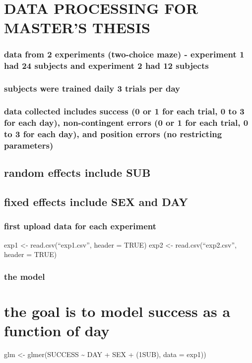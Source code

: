 \documentclass[]{article}
\title{}
\author{}
\date{}
\begin{document}
\section{DATA PROCESSING FOR MASTER'S
THESIS}\label{data-processing-for-masters-thesis}

\subsubsection{data from 2 experiments (two-choice maze) - experiment 1
had 24 subjects and experiment 2 had 12
subjects}\label{data-from-2-experiments-two-choice-maze---experiment-1-had-24-subjects-and-experiment-2-had-12-subjects}

\subsubsection{subjects were trained daily 3 trials per
day}\label{subjects-were-trained-daily-3-trials-per-day}

\subsubsection{data collected includes success (0 or 1 for each trial, 0
to 3 for each day), non-contingent errors (0 or 1 for each trial, 0 to 3
for each day), and position errors (no restricting
parameters)}\label{data-collected-includes-success-0-or-1-for-each-trial-0-to-3-for-each-day-non-contingent-errors-0-or-1-for-each-trial-0-to-3-for-each-day-and-position-errors-no-restricting-parameters}

\subsection{random effects include
SUB}\label{random-effects-include-sub}

\subsection{fixed effects include SEX and
DAY}\label{fixed-effects-include-sex-and-day}

\subsubsection{first upload data for each
experiment}\label{first-upload-data-for-each-experiment}

exp1 \textless{}- read.csv(``exp1.csv'', header = TRUE) exp2
\textless{}- read.csv(``exp2.csv'', header = TRUE)

\subsubsection{the model}\label{the-model}

\section{the goal is to model success as a function of
day}\label{the-goal-is-to-model-success-as-a-function-of-day}

glm \textless{}- glmer(SUCCESS \textasciitilde{} DAY + SEX +
(1\textbar{}SUB), data = exp1))
\end{document}
